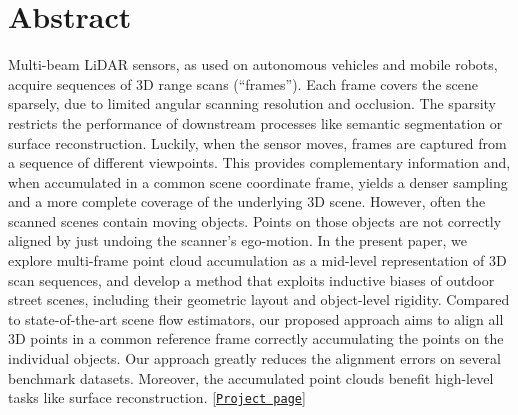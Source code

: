 \section*{Abstract}
Multi-beam LiDAR sensors, as used on autonomous vehicles and mobile robots, acquire sequences of 3D range scans (``frames''). Each frame covers the scene sparsely, due to limited angular scanning resolution and occlusion. The sparsity restricts the performance of downstream processes like semantic segmentation or surface reconstruction. Luckily, when the sensor moves, frames are captured from a sequence of different viewpoints. This provides complementary information and, when accumulated in a common scene coordinate frame, yields a denser sampling and a more complete coverage of the underlying 3D scene. However, often the scanned scenes contain moving objects. Points on those objects are not correctly aligned by just undoing the scanner's ego-motion. In the present paper, we explore multi-frame point cloud accumulation as a mid-level representation of 3D scan sequences, and develop a method that exploits inductive biases of outdoor street scenes, including their geometric layout and object-level rigidity. Compared to state-of-the-art scene flow estimators, our proposed approach aims to align all 3D points in a common reference frame correctly accumulating the points on the individual objects. Our approach greatly reduces the alignment errors on several benchmark datasets. Moreover, the accumulated point clouds benefit high-level tasks like surface reconstruction. [\href{shengyuh.github.io/eccv22/index.html}{\texttt{Project page}}]  